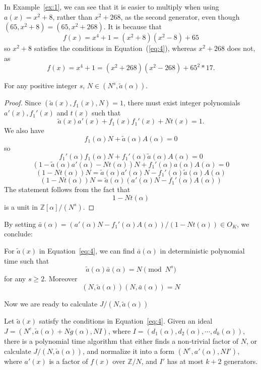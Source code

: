 \documentclass[runningheads, letter]{llncs}
\newcommand{\Z}{{\mathbb Z}}
\begin{document}
\begin{example}
  In Example~\ref{ex:1}, we can see that it is
  easier to multiply when using \( a(x) = x^2+8 \),
  rather than \(x^2 + 268\), as the second generator,
  even though \( (65, x^2 + 8) = (65, x^2 + 268) \).
  It is because that
  \[ f(x)= x^4+1 = (x^2+8) (x^2-8)+65  \]
  so \( x^2+8 \) satisfies the conditions in
  Equation~(\ref{eq:4}), whereas \( x^2+268 \) does not,
  as
  \[ f(x) = x^4+1 = (x^2+268) (x^2-268)+65^2*17.  \]
\end{example}

\begin{lemma}\label{lem:genN}
  For any positive integer \( s \), \( N \in (N^s, \tilde{a}(\alpha) )\).
\end{lemma}

\begin{proof}
Since \( (\tilde{a}(x), f_1 (x), N ) = 1 \),
there must exist integer polynomials \( a'(x), f_1'(x) \)
and \( t(x) \) such that
\[ \tilde{a}(x) a'(x) + f_1(x) f_1'(x) + N t(x) = 1.  \]
We also have
\[ f_1 (\alpha) N + \tilde{a}(\alpha) A(\alpha) =0 \]
so
\[ f_1'(\alpha) f_1 (\alpha) N + f_1'(\alpha) \tilde{a}(\alpha) A(\alpha) =0 \]
\[ (1 - \tilde{a}(\alpha) a'(\alpha) - N t(\alpha)) N + f_1'(\alpha)
  a(\alpha) A(\alpha) =0 \]
\[ (1 -  N t(\alpha)) N = \tilde{a}(\alpha) a'(\alpha) N
  - f_1'(\alpha) \tilde{a} (\alpha) A(\alpha)  \]
\[ (1 -  N t(\alpha)) N = \tilde{a}(\alpha) ( a'(\alpha) N
  - f_1'(\alpha)   A(\alpha)  ) \]
The statement follows from the fact that
\[ 1- N t(\alpha)  \] is a unit in
\( \Z[\alpha]/(N^{s}) \).
\end{proof}

By setting \( \bar{a}(\alpha) = (a'(\alpha) N
- f_1'(\alpha)  A(\alpha))/(1 - N t(\alpha)) \in O_K \),
we conclude:

\begin{corollary}
  For \( \tilde{a} (x) \) in Equation~\ref{eq:4},
  we can find \( \bar{a}(\alpha) \) in deterministic
  polynomial time such that
  \[ \tilde{a}(\alpha)  \bar{a}(\alpha)  = N \pmod{N^s}  \]
  for any \( s\geq 2 \). Moreover
  \[ (N, \tilde{a}(\alpha)) (N, \bar{a}(\alpha)) = N   \]
\end{corollary}

Now we are ready to calculate \( J/ (N, \tilde{a}(\alpha))  \)
\begin{lemma}
\label{lem:other}
Let \( \tilde{a} (x) \) satisfy the conditions
in Equation~\ref{eq:4}.
Given an ideal \( J = (N^e, \tilde{a}(\alpha) + N g(\alpha), N I) \),
where \( I = (d_1 (\alpha), d_2(\alpha), \cdots, d_k (\alpha)) \),
there is a polynomial time algorithm that either finds a non-trivial
factor of \( N \), or calculate \( J/ (N, \tilde{a}(\alpha)) \),
and normalize it into a form
\( (N^e, a' (\alpha) , N I'), \)
where \( a' (x) \) is a factor of \( f(x) \)
over \( \Z/N \), and \( I' \) has at most \( k+2 \) generators.
\end{lemma}
\end{document}
